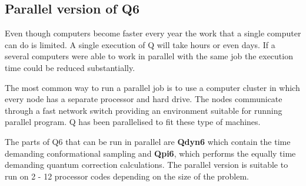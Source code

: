 \documentclass[a4paper,11pt]{article}
\begin{document}
\subsection{Parallel version of Q6} Even though computers become
faster every year the work that a single computer can do is
limited. A single execution of Q will take hours or even days. If
a several computers were able to work in parallel with the same
job the execution time could be reduced substantially.

The most common way to run a parallel job is to use a computer
cluster in which every node has a separate processor and hard
drive. The nodes communicate through a fast network switch
providing an environment suitable for running parallel program. Q
has been parallelised to fit these type of machines.

The parts of Q6 that can be run in parallel are \textbf{Qdyn6} which contain
the time demanding conformational sampling and \textbf{Qpi6}, which performs
the equally time demanding quantum correction calculations. The parallel version
is suitable to run on 2 - 12 processor codes depending on the size of the
problem.
\end{document}
